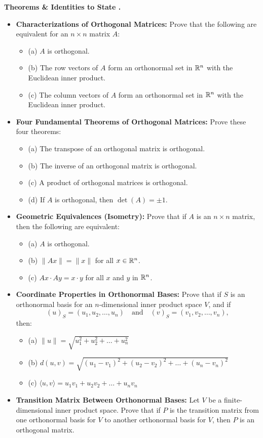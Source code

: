 \documentclass{../../../templates/natsirt}
\newcounter{topic}[section]
\newenvironment{theoremsbox}[1][]{%
    \begin{greenbox}[#1]\refstepcounter{topic}\textbf{Theorems \& Identities to State \thesection.\thetopic}%
}{\end{greenbox}}
\newcommand{\citem}{\item[$\square$]}
\begin{document}
\begin{theoremsbox}
    \begin{itemize}
        \citem \textbf{Characterizations of Orthogonal Matrices:} Prove that the following are equivalent for an $n \times n$ matrix $A$:
        \begin{itemize}
            \citem (a) $A$ is orthogonal.
            \citem (b) The row vectors of $A$ form an orthonormal set in $\mathbb{R}^n$ with the Euclidean inner product.
            \citem (c) The column vectors of $A$ form an orthonormal set in $\mathbb{R}^n$ with the Euclidean inner product.
        \end{itemize}
        \citem \textbf{Four Fundamental Theorems of Orthogonal Matrices:} Prove these four theorems:
        \begin{itemize}
            \citem (a) The transpose of an orthogonal matrix is orthogonal.
            \citem (b) The inverse of an orthogonal matrix is orthogonal.
            \citem (c) A product of orthogonal matrices is orthogonal.
            \citem (d) If $A$ is orthogonal, then $\det(A) = \pm 1$.
        \end{itemize}
        \citem \textbf{Geometric Equivalences (Isometry):} Prove that if $A$ is an $n \times n$ matrix, then the following are equivalent:
        \begin{itemize}
            \citem (a) $A$ is orthogonal.
            \citem (b) $\|Ax\| = \|x\|$ for all $x \in \mathbb{R}^n$.
            \citem (c) $Ax \cdot Ay = x \cdot y$ for all $x$ and $y$ in $\mathbb{R}^n$.
        \end{itemize}
        \citem \textbf{Coordinate Properties in Orthonormal Bases:} Prove that if $S$ is an orthonormal basis for an $n$-dimensional inner product space $V$, and if
        \[ (u)_S = (u_1, u_2, \dots, u_n) \quad \text{and} \quad (v)_S = (v_1, v_2, \dots, v_n), \]
        then:
        \begin{itemize}
            \citem (a) $\|u\| = \sqrt{u_1^2 + u_2^2 + \dots + u_n^2}$
            \citem (b) $d(u, v) = \sqrt{(u_1 - v_1)^2 + (u_2 - v_2)^2 + \dots + (u_n - v_n)^2}$
            \citem (c) $\langle u, v \rangle = u_1 v_1 + u_2 v_2 + \dots + u_n v_n$
        \end{itemize}
        \citem \textbf{Transition Matrix Between Orthonormal Bases:} Let $V$ be a finite-dimensional inner product space. Prove that if $P$ is the transition matrix from one orthonormal basis for $V$ to another orthonormal basis for $V$, then $P$ is an orthogonal matrix.
    \end{itemize}
\end{theoremsbox}
\end{document}
